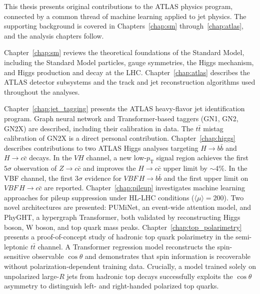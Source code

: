 This thesis presents original contributions to the ATLAS physics program, connected by a common thread of machine learning applied to jet physics.
The supporting background is covered in Chapters~\ref{chap:sm} through~\ref{chap:atlas}, and the analysis chapters follow.

Chapter~\ref{chap:sm} reviews the theoretical foundations of the Standard Model, including the Standard Model particles, gauge symmetries, the Higgs mechanism, and Higgs production and decay at the LHC.
Chapter~\ref{chap:atlas} describes the ATLAS detector subsystems and the track and jet reconstruction algorithms used throughout the analyses.

Chapter~\ref{chap:jet_tagging} presents the ATLAS heavy-flavor jet identification program.
Graph neural network and Transformer-based taggers (GN1, GN2, GN2X) are described, including their calibration in data.
The $t\bar{t}$ mistag calibration of GN2X is a direct personal contribution.
Chapter~\ref{chap:higgs} describes contributions to two ATLAS Higgs analyses targeting $H \to b\bar{b}$ and $H \to c\bar{c}$ decays.
In the $VH$ channel, a new low-$p_\mathrm{T}$ signal region achieves the first $5\sigma$ observation of $Z \to c\bar{c}$ and improves the $H \to c\bar{c}$ upper limit by $\sim$4\%.
In the VBF channel, the first $3\sigma$ evidence for $VBF\,H \to b\bar{b}$ and the first upper limit on $VBF\,H \to c\bar{c}$ are reported.
Chapter~\ref{chap:pileup} investigates machine learning approaches for pileup suppression under HL-LHC conditions ($\langle\mu\rangle = 200$).
Two novel architectures are presented: PUMiNet, an event-wide attention model, and PhyGHT, a hypergraph Transformer, both validated by reconstructing Higgs boson, W boson, and top quark mass peaks.
Chapter~\ref{chap:top_polarimetry} presents a proof-of-concept study of hadronic top quark polarimetry in the semi-leptonic $t\bar{t}$ channel.
A Transformer regression model reconstructs the spin-sensitive observable $\cos\theta$ and demonstrates that spin information is recoverable without polarization-dependent training data. Crucially, a model trained solely on unpolarized large-$R$ jets from hadronic top decays successfully exploits the $\cos\theta$ asymmetry to distinguish left- and right-handed polarized top quarks.
